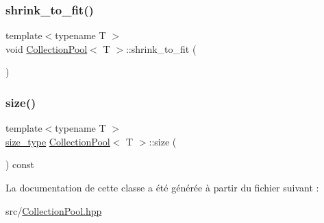 \mbox{\label{class_collection_pool_a99d7be7a85d94c4288683b900af1e087}} 
\subsubsection{\texorpdfstring{shrink\+\_\+to\+\_\+fit()}{shrink\_to\_fit()}}
{\footnotesize\ttfamily template$<$typename T $>$ \\
void \hyperlink{class_collection_pool}{Collection\+Pool}$<$ T $>$\+::shrink\+\_\+to\+\_\+fit (\begin{DoxyParamCaption}{ }\end{DoxyParamCaption})\hspace{0.3cm}{\ttfamily [inline]}}

\mbox{\label{class_collection_pool_aa5b3ebca322cda930b17a0cfab3f91f2}} 
\subsubsection{\texorpdfstring{size()}{size()}}
{\footnotesize\ttfamily template$<$typename T $>$ \\
\hyperlink{class_collection_a3f8b024f587aa20be530866da30948c4}{size\+\_\+type} \hyperlink{class_collection_pool}{Collection\+Pool}$<$ T $>$\+::size (\begin{DoxyParamCaption}{ }\end{DoxyParamCaption}) const\hspace{0.3cm}{\ttfamily [inline]}}



La documentation de cette classe a été générée à partir du fichier suivant \+:\begin{DoxyCompactItemize}
\item 
src/\hyperlink{_collection_pool_8hpp}{Collection\+Pool.\+hpp}\end{DoxyCompactItemize}
